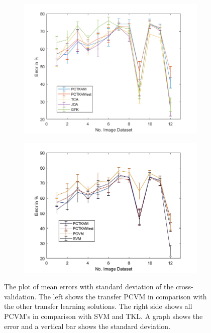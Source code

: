 \begin{figure}
	\centering
	\begin{subfigure}{.5\textwidth}
		\centering
		\includegraphics[width=1\linewidth]{figures/FiveTwoImageTL.png}
		\caption{\label{FigErrorImgTL}}
	\end{subfigure}%
	\begin{subfigure}{.5\textwidth}
		\centering
		\includegraphics[width=1\linewidth]{figures/PerformanceImage.png}
		\caption{\label{FigErrorImgO}}
	\end{subfigure}
	\caption[Plot of Mean Error and Standard Deviation on Image Dataset (CV)]{The plot of mean errors with standard deviation of the cross-validation. The left shows the transfer \acs{PCVM} in comparison with the other transfer learning solutions. The right side shows all \acs{PCVM}'s in comparison with \acs{SVM} and \acs{TKL}. A graph shows the error and a vertical bar shows the standard deviation. \label{FigErrorImgDatasetsB}}
\end{figure}

